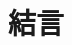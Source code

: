 \documentclass[12pt, a4j, dvipdfmx]{jarticle}
\begin{document}
\section{\large 結言}
\par
\end{document}
